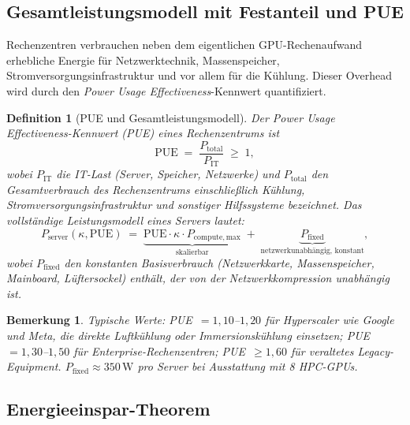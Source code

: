 \documentclass[12pt, a4paper, openany]{report}
\newtheorem{definition}[theorem]{Definition}
\newtheorem{remark}[theorem]{Bemerkung}
\begin{document}
\subsection{Gesamtleistungsmodell mit Festanteil und PUE}

Rechenzentren verbrauchen neben dem eigentlichen GPU-Rechenaufwand erhebliche
Energie für Netzwerktechnik, Massenspeicher, Stromversorgungsinfrastruktur
und vor allem für die Kühlung.  Dieser Overhead wird durch den
\emph{Power Usage Effectiveness}-Kennwert quantifiziert.

\begin{definition}[PUE und Gesamtleistungsmodell]
\label{def:pue}
Der \emph{Power Usage Effectiveness}-Kennwert (PUE) eines Rechenzentrums ist
\begin{equation}
  \label{eq:pue_def}
  \mathrm{PUE}
  \;=\;
  \frac{P_{\mathrm{total}}}{P_{\mathrm{IT}}}
  \;\geq\; 1,
\end{equation}
wobei $P_{\mathrm{IT}}$ die IT-Last (Server, Speicher, Netzwerke) und
$P_{\mathrm{total}}$ den Gesamtverbrauch des Rechenzentrums
einschließlich Kühlung, Stromversorgungsinfrastruktur und sonstiger
Hilfssysteme bezeichnet.  Das \emph{vollständige Leistungsmodell} eines
Servers lautet:
\begin{equation}
  \label{eq:total_power}
  P_{\mathrm{server}}(\kappa, \mathrm{PUE})
  \;=\;
  \underbrace{\mathrm{PUE} \cdot \kappa \cdot P_{\mathrm{compute,max}}}_{\text{skalierbar}}
  \;+\;
  \underbrace{P_{\mathrm{fixed}}}_{\text{netzwerkunabhängig, konstant}},
\end{equation}
wobei $P_{\mathrm{fixed}}$ den konstanten Basisverbrauch (Netzwerkkarte,
Massenspeicher, Mainboard, Lüftersockel) enthält, der von der Netzwerkkompression
\emph{unabhängig} ist.
\end{definition}

\begin{remark}
Typische Werte: PUE~$= 1{,}10$--$1{,}20$ für Hyperscaler wie Google und
Meta, die direkte Luftkühlung oder Immersionskühlung einsetzen;
PUE~$= 1{,}30$--$1{,}50$ für Enterprise-Rechenzentren;
PUE~$\geq 1{,}60$ für veraltetes Legacy-Equipment.
$P_{\mathrm{fixed}} \approx 350\,\mathrm{W}$ pro Server bei Ausstattung
mit 8 HPC-GPUs.
\end{remark}

\subsection{Energieeinspar-Theorem}
\end{document}

